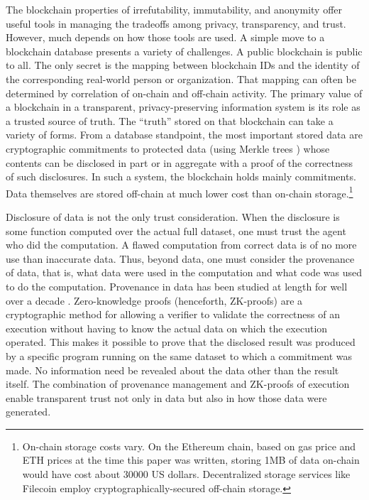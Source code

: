 \documentclass[11pt,dvipdfm]{article}
\begin{document}
The blockchain properties of irrefutability, immutability, and anonymity \cite{DSC-BCDB}  offer useful tools in managing the tradeoffs among privacy, transparency, and trust.
However, much depends on how those tools are used.
A simple move to a blockchain database presents a variety of challenges.
A public blockchain is public to all.  The only secret is the mapping between blockchain IDs and
the identity of the corresponding real-world person or organization.  That mapping can often be
determined by correlation of on-chain and off-chain activity. 
The primary value of a blockchain in a transparent, privacy-preserving 
information system is its role as a trusted source of truth. The ``truth'' stored on that
blockchain  can take a variety of forms.  
From a database standpoint, the most important stored data are cryptographic commitments to protected data
(using Merkle trees \cite{Merkle87})  whose contents
can be disclosed in part or in aggregate with a proof of the correctness of such
disclosures.
In such a system, the blockchain holds mainly commitments.  Data themselves are stored off-chain
at much lower cost than on-chain storage.\footnote{On-chain storage costs vary.  On the Ethereum chain,
based on gas price and ETH prices at the time this paper was written, storing 1MB of data on-chain would
have cost about 30000 US dollars.  Decentralized storage services like Filecoin employ cryptographically-secured
off-chain storage.}

Disclosure of data is not the only trust consideration.  When the disclosure  is
some function computed over the actual full dataset, one must trust the agent who did the
computation.  A flawed computation from correct data is of no more use than inaccurate data.  Thus, beyond data, one must consider the provenance of data, that is, what data
were used in the computation and what code was used to do the computation.
Provenance in data has been studied at length for well over a decade \cite{margo}.
Zero-knowledge proofs\cite{micali} (henceforth, ZK-proofs) are a cryptographic method for allowing a
verifier to validate the correctness of an execution without having to know the actual data
on which the execution operated.  This makes it possible to prove that the disclosed result was 
produced by a specific program running on the same dataset to which a commitment was made.
No information need be revealed about the  data other than the result itself.
The combination of provenance management and ZK-proofs of execution enable transparent trust
not only in data but also in how those data were generated.
\end{document}
